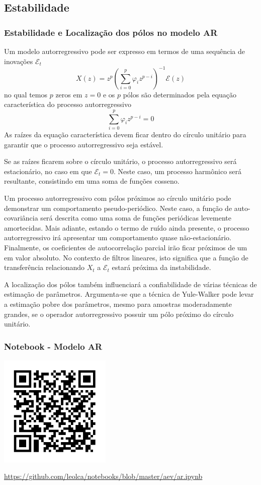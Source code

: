 \subsection{Estabilidade}
\begin{frame}[allowframebreaks]
  \frametitle{Estabilidade e Localização dos pólos no modelo AR}
  Um modelo autorregressivo pode ser expresso em termos de uma
  sequência de inovações $\mathcal{E}_t$
  \begin{equation}
        X (z) = z^p \left( \sum_{i=0}^{p} \varphi_i z^{p-i} \right)^{-1} \mathcal{E}(z)
  \end{equation}
  no qual temos $p$ zeros em $z=0$ e os $p$ pólos são determinados
  pela equação característica do processo autorregressivo
  \begin{equation}
        \sum_{i=0}^{p} \varphi_i z^{p-i} = 0
  \end{equation}
  As raízes da equação característica devem ficar dentro do círculo
  unitário para garantir que o processo autorregressivo seja estável.
  
  Se as raízes ficarem sobre o círculo unitário, o processo autorregressivo
  será estacionário, no caso em que $\mathcal{E}_t = 0$. Neste caso,
  um processo harmônico será resultante, consistindo em uma soma de funções
  cosseno. 
  
  Um processo autorregressivo com pólos próximos ao círculo unitário
  pode demonstrar um comportamento pseudo-periódico. Neste caso,
  a função de auto-covariância será descrita como uma soma de funções
  periódicas levemente amortecidas. Mais adiante, estando o termo de 
  ruído ainda presente, o processo autorregressivo irá apresentar
  um comportamento quase não-estacionário.
  Finalmente, os coeficientes de autocorrelação parcial irão ficar
  próximos de um em valor absoluto. No contexto de filtros lineares,
  isto significa que a função de transferência relacionando $X_t$ a
  $\mathcal{E}_t$ estará próxima da instabilidade.
  
  A localização dos pólos também influenciará a confiabilidade
  de várias técnicas de estimação de parâmetros. Argumenta-se que
  a técnica de Yule-Walker pode levar a estimação pobre dos parâmetros,
  mesmo para amostras moderadamente grandes, se o operador autorregressivo
  possuir um pólo próximo do círculo unitário.
\end{frame}


\begin{frame}%
  \frametitle{Notebook - Modelo AR}
  \centering
  \includegraphics[width=0.4\textwidth]{images/qrcode-jupyter-ar.pdf}

  \url{https://github.com/leolca/notebooks/blob/master/aev/ar.ipynb}
\end{frame} 

